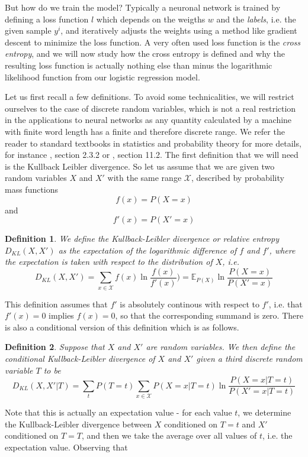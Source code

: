 \documentclass[a4paper, draft]{report}
\numberwithin{section}{chapter}
\numberwithin{equation}{chapter}
\theoremstyle{own}
\newtheorem{defn}{Definition}[section]
\theoremstyle{remark}
\begin{document}
But how do we train the model? Typically a neuronal network is trained by defining a loss function $l$ which depends on the weigths $w$ and the {\em labels}, i.e. the given sample $y^i$, and iteratively adjusts the weights using a method like gradient descent to minimize the loss function. A very often used loss function is the {\em cross entropy}, and we will now study how the cross entropy is defined and why the resulting loss function is actually nothing else than minus the logarithmic likelihood function from our logistic regression model.

Let us first recall a few definitions. To avoid some technicalities, we will restrict ourselves to the case of discrete random variables, which is not a real restriction in the applications to neural networks as any quantity calculated by a machine with finite word length has a finite and therefore discrete range. We refer the reader to standard textbooks in statistics and probability theory for more details, for instance \cite{Schervish}, section 2.3.2 or \cite{LehmannRomano}, section 11.2. The first definition that we will need is the Kullback Leibler divergence. So let us assume that we are given two random variables $X$ and $X'$ with the same range ${\mathcal X}$, described by probability mass functions
$$
f(x) = P(X = x)
$$
and
$$
f'(x) = P(X' = x)
$$
\begin{defn}
We define the Kullback-Leibler divergence or relative entropy $D_{KL}(X,X')$ as the expectation of the logarithmic difference of $f$ and $f'$, where the expectation is taken with respect to the distribution of $X$, i.e.
$$
D_{KL}(X, X') = \sum_{x \in {\mathcal X}} f(x) \ln \frac{f(x)}{f'(x)}) = {\mathbb{E}}_{P(X)} \ln \frac{P(X = x)}{P(X' = x)}
$$
\end{defn}
This definition assumes that $f'$ is absolutely continous with respect to $f'$, i.e. that $f'(x)=0$ implies $f(x)=0$, so that the corresponding summand is zero. There is also a conditional version of this definition which is as follows.
\begin{defn}
Suppose that $X$ and $X'$ are random variables. We then define the conditional Kullback-Leibler divergence of $X$ and $X'$ given a third discrete random variable $T$ to be 
$$
D_{KL}(X, X' | T) = \sum_{t} P(T=t) \sum_{x \in {\mathcal X}} P(X = x  | T = t) \ln \frac{P(X = x | T = t)}{P(X' = x | T = t)}
$$
\end{defn}
Note that this is actually an expectation value - for each value $t$, we determine the Kullback-Leibler divergence between $X$ conditioned on $T = t$ and $X'$ conditioned on $T = T$, and then we take the average over all values of $t$, i.e. the expectation value.  Observing that 
\end{document}
